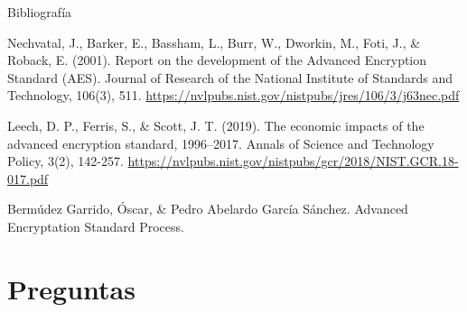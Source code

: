 \documentclass{beamer}
\begin{document}
\begin{frame}[allowframebreaks]{Bibliografía}
\begin{thebibliography}{9}

	Nechvatal, J., Barker, E., Bassham, L., Burr, W., Dworkin, M., Foti, J., \& Roback, E. (2001). Report on the development of the Advanced Encryption Standard (AES). Journal of Research of the National Institute of Standards and Technology, 106(3), 511. \url{https://nvlpubs.nist.gov/nistpubs/jres/106/3/j63nec.pdf}


	Leech, D. P., Ferris, S., \& Scott, J. T. (2019). The economic impacts of the advanced encryption standard, 1996–2017. Annals of Science and Technology Policy, 3(2), 142-257. \url{https://nvlpubs.nist.gov/nistpubs/gcr/2018/NIST.GCR.18-017.pdf}



	Bermúdez Garrido, Óscar, \& Pedro Abelardo García Sánchez. Advanced Encryptation Standard Process.

\end{thebibliography}


\end{frame}

\section{Preguntas}
\end{document}

